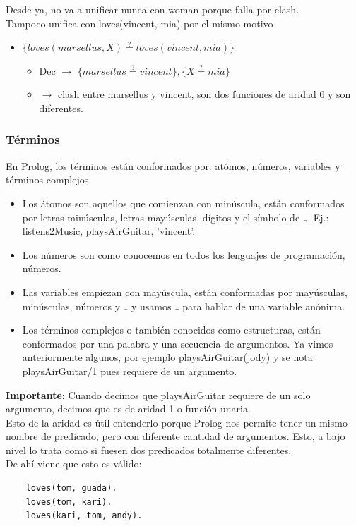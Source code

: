 \documentclass[10pt,a4paper]{article}
\begin{document}
Desde ya, no va a unificar nunca con woman porque falla por clash. \\
Tampoco unifica con loves(vincent, mia) por el mismo motivo 
\begin{itemize}
    \item  $\{loves(marsellus, X) \stackrel{{?}}{=} loves(vincent, mia)\}$ 
    \begin{itemize}
        \item Dec $\rightarrow$ $\{marsellus \stackrel{{?}}{=} vincent\}, \{X \stackrel{{?}}{=} mia\}$  
        \item $\rightarrow$ clash entre marsellus y vincent, son dos funciones de aridad 0 y son diferentes.
    \end{itemize}
\end{itemize}
\subsubsection*{Términos}
En Prolog, los términos están conformados por: atómos, números, variables y términos complejos. 
\begin{itemize}
    \item Los átomos son aquellos que comienzan con minúscula, están conformados por letras minúsculas, letras mayúsculas, dígitos y el símbolo de $\mathunderscore$. Ej.: listens2Music, playsAirGuitar, 'vincent'.
    \item Los números son como conocemos en todos los lenguajes de programación, números.
    \item Las variables empiezan con mayúscula, están conformadas por mayúsculas, minúsculas, números y $\mathunderscore$ y usamos $\mathunderscore$ para hablar de una variable anónima. 
    \item Los términos complejos o también conocidos como estructuras, están conformados por una palabra y una secuencia de argumentos. Ya vimos anteriormente algunos, por ejemplo playsAirGuitar(jody) y se nota playsAirGuitar/1 pues requiere de un argumento.
\end{itemize}
\textbf{Importante}: Cuando decimos que playsAirGuitar requiere de un solo argumento, decimos que es de aridad 1 o función unaria. \\
Esto de la aridad es útil entenderlo porque Prolog nos permite tener un mismo nombre de predicado, pero con diferente cantidad de argumentos. Esto, a bajo nivel lo trata como si fuesen dos predicados totalmente diferentes. \\
De ahí viene que esto es válido:
\begin{lstlisting}
    loves(tom, guada).
    loves(tom, kari).
    loves(kari, tom, andy).
\end{lstlisting}
\end{document}
